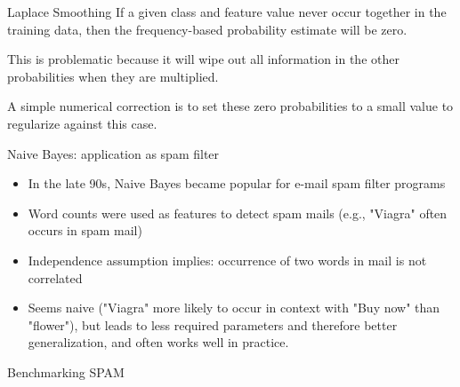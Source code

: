 \documentclass[11pt,compress,t,notes=noshow, xcolor=table]{beamer}
\begin{document}
\begin{vbframe}{Laplace Smoothing}
If a given class and feature value never occur together in the training data, then the frequency-based probability estimate will be zero.

\lz

This is problematic because it will wipe out all information in the other probabilities when they are multiplied.

\lz
%
A simple numerical correction is to set these zero probabilities to a small value to regularize against this case.


\end{vbframe}

\begin{vbframe}{Naive Bayes: application as spam filter}
\begin{itemize}
  \item In the late 90s, Naive Bayes became popular for e-mail spam filter programs
  \item Word counts were used as features to detect spam mails (e.g., "Viagra" often occurs in spam mail)
  \item Independence assumption implies: occurrence of two words in mail is not correlated
  \item Seems naive ("Viagra" more likely to occur in context with "Buy now" than "flower"), but leads to less required parameters and therefore better generalization, and often works well in practice.
\end{itemize}
\end{vbframe}

\begin{vbframe}{Benchmarking SPAM}

\end{vbframe}

\endlecture
\end{document}
